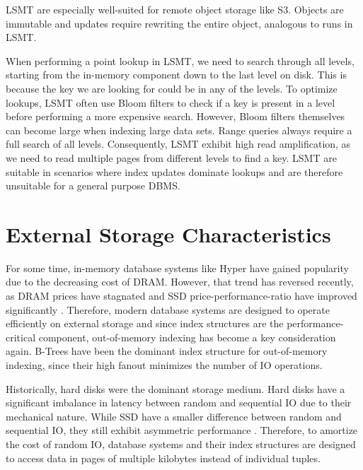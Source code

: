 \ac{LSMT} are especially well-suited for remote object storage like S3. Objects are immutable and updates require rewriting the entire object, analogous to runs in \ac{LSMT}.

When performing a point lookup in \ac{LSMT}, we need to search through all levels, starting from the in-memory component down to the last level on disk.
This is because the key we are looking for could be in any of the levels.
To optimize lookups, \ac{LSMT} often use Bloom filters to check if a key is present in a level before performing a more expensive search.
However, Bloom filters themselves can become large when indexing large data sets.
Range queries always require a full search of all levels.
Consequently, \ac{LSMT} exhibit high read amplification, as we need to read multiple pages from different levels to find a key.
\ac{LSMT} are suitable in scenarios where index updates dominate lookups and are therefore unsuitable for a general purpose \ac{DBMS}.


\section{External Storage Characteristics}
For some time, in-memory database systems like Hyper \cite{kemper2011hyper} have gained popularity due to the decreasing cost of \ac{DRAM}.
However, that trend has reversed recently, as \ac{DRAM} prices have stagnated \cite{haas2023modern} and \ac{SSD} price-performance-ratio have improved significantly \cite{leis2024leanstore}.
Therefore, modern database systems are designed to operate efficiently on external storage and since index structures are the performance-critical component, out-of-memory indexing has become a key consideration again.
B-Trees have been the dominant index structure for out-of-memory indexing, since their high fanout minimizes the number of \ac{IO} operations.

Historically, hard disks were the dominant storage medium.
Hard disks have a significant imbalance in latency between random and sequential \ac{IO} due to their mechanical nature.
While \ac{SSD} have a smaller difference between random and sequential \ac{IO}, they still exhibit asymmetric performance \cite{haas2023modern}.
Therefore, to amortize the cost of random \ac{IO}, database systems and their index structures are designed to access data in pages of multiple kilobytes instead of individual tuples.


